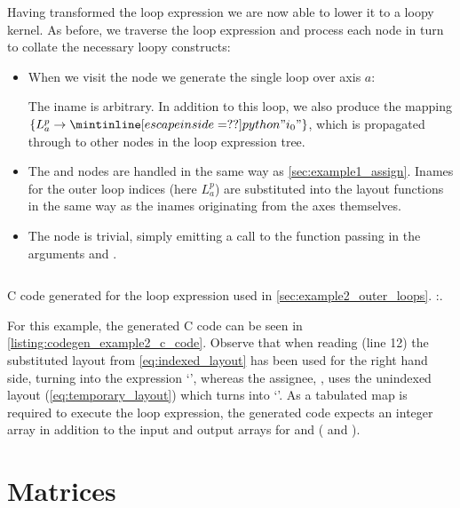 \documentclass[thesis]{subfiles}
\begin{document}
Having transformed the loop expression we are now able to lower it to a loopy kernel.
As before, we traverse the loop expression and process each node in turn to collate the necessary loopy constructs:
\begin{itemize}
  \item
    When we visit the  node we generate the single loop over axis $a$:
    \begin{pyinline}
    \end{pyinline}
    The iname  is arbitrary.
    In addition to this loop, we also produce the mapping $\{ L^p_a \to \pycode{"i_0"} \}$, which is propagated through to other nodes in the loop expression tree.
  \item
    The  and  nodes are handled in the same way as \cref{sec:example1_assign}.
    Inames for the outer loop indices (here $L^p_a$) are substituted into the layout functions in the same way as the inames originating from the axes themselves.
  \item
    The  node is trivial, simply emitting a call to the function passing in the arguments  and .
\end{itemize}

\begin{listing}
  \centering
  \begin{minipage}{.9\textwidth}
    \inputminted[linenos]{c}{./scripts/artefacts/codegen_example2_c_code_tidy.c}
  \end{minipage}
  \caption{
    C code generated for the loop expression used in \cref{sec:example2_outer_loops}.
    :.
  }
  \label{listing:codegen_example2_c_code}
\end{listing}

For this example, the generated C code can be seen in \cref{listing:codegen_example2_c_code}.
Observe that when reading  (line 12) the substituted layout from \cref{eq:indexed_layout} has been used for the right hand side, turning into the expression `', whereas the assignee, , uses the unindexed layout (\cref{eq:temporary_layout}) which turns into `'.
As a tabulated map is required to execute the loop expression, the generated code expects an integer array  in addition to the input and output arrays for  and  ( and ).

\section{Matrices}
\label{sec:impl_matrices}
\end{document}
